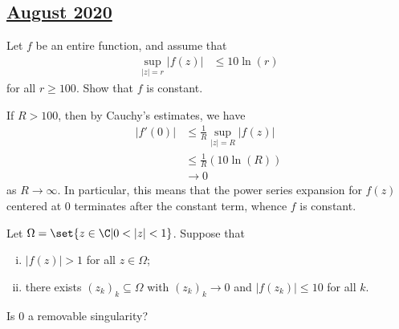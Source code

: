 \documentclass[10pt]{mypackage}
\begin{document}
\subsection{\href{https://math.virginia.edu/graduate/exams/analysis/2020Aug_complex.html}{August 2020}}%
\begin{problem}[Problem 1]
  Let $f$ be an entire function, and assume that
  \begin{align*}
    \sup_{|z| = r} \left\vert f(z) \right\vert &\leq 10 \ln\left( r \right)
  \end{align*}
  for all $r \geq 100$. Show that $f$ is constant.
\end{problem}
\begin{solution}
  If $R > 100$, then by Cauchy's estimates, we have
  \begin{align*}
    \left\vert f'(0) \right\vert &\leq \frac{1}{R} \sup_{|z| = R} \left\vert f(z) \right\vert\\
                                 &\leq \frac{1}{R} \left( 10\ln(R) \right)\\
                                 &\rightarrow 0
  \end{align*}
  as $R\rightarrow\infty$. In particular, this means that the power series expansion for $f(z)$ centered at $0$ terminates after the constant term, whence $f$ is constant.
\end{solution}
\begin{problem}[Problem 2]
  Let $\Omega = \set{z\in \C | 0 < |z| < 1}$. Suppose that
  \begin{enumerate}[(i)]
    \item $\left\vert f(z) \right\vert > 1$ for all $z\in \Omega$;
    \item there exists $\left( z_k \right)_k\subseteq \Omega$ with $\left( z_k \right)_k\rightarrow 0$ and $\left\vert f\left( z_k \right) \right\vert \leq 10$ for all $k$.
  \end{enumerate}
  Is $0$ a removable singularity?
\end{problem}
\end{document}
